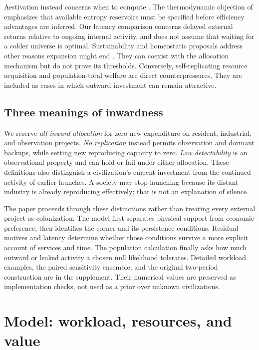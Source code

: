 \documentclass[11pt,a4paper]{article}
\theoremstyle{definition}\newtheorem{definition}{Definition}
\begin{document}
Aestivation instead concerns when to compute \citep{Sandberg2017}. The
thermodynamic objection of \citet{BennettHansonRiedel2019} emphasizes that
available entropy reservoirs must be specified before efficiency advantages
are inferred. Our latency comparison concerns delayed external returns
relative to ongoing internal activity, and does not assume that waiting
for a colder universe is optimal. Sustainability and homeostatic proposals
address other reasons expansion might end \citep{HaqqMisraBaum2009,WongBartlett2022}.
They can coexist with the allocation mechanism but do not prove its
thresholds. Conversely, self-replicating resource acquisition
\citep{ArmstrongSandberg2013} and population-total welfare
\citep{Bostrom2003Waste} are direct counterpressures. They are included as
cases in which outward investment can remain attractive.

\subsection{Three meanings of inwardness}
We reserve \emph{all-inward allocation} for zero new expenditure on resident,
industrial, and observation projects. \emph{No replication} instead permits
observation and dormant backups, while setting new reproducing capacity
to zero. \emph{Low detectability} is an observational property and can hold
or fail under either allocation. These definitions also distinguish a
civilization's current investment from the continued activity of earlier
launches. A society may stop launching because its distant industry is
already reproducing effectively; that is not an explanation of silence.

The paper proceeds through these distinctions rather than treating every
external project as colonization. The model first separates physical
support from economic preference, then identifies the corner and its
persistence conditions. Residual motives and latency determine whether
those conditions survive a more explicit account of services and time.
The population calculation finally asks how much outward or leaked activity
a chosen null likelihood tolerates. Detailed workload examples, the paired
sensitivity ensemble, and the original two-period construction are in the
supplement. Their numerical values are preserved as implementation checks,
not used as a prior over unknown civilizations.

\section{Model: workload, resources, and value}
\label{sec:support}
\label{sec:allocation}
\end{document}

